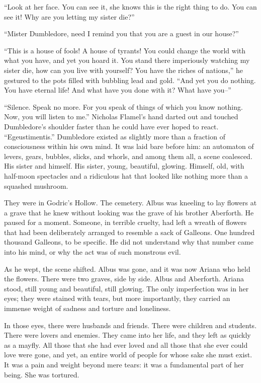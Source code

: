 “Look at her face. You can see it, she knows this is the right thing to do. You can see it! Why are you letting my sister die?”

“Mister Dumbledore, need I remind you that you are a guest in our house?”

“This is a house of fools! A house of tyrants! You could change the world with what you have, and yet you hoard it. You stand there imperiously watching my sister die, how can you live with yourself? You have the riches of nations,” he gestured to the pots filled with bubbling lead and gold. “And yet you do nothing. You have eternal life! And what have you done with it? What have you–”

“Silence. Speak no more. For you speak of things of which you know nothing. Now, you will listen to me.” Nicholas Flamel’s hand darted out and touched Dumbledore’s shoulder faster than he could have ever hoped to react. “Egeustimentis.”
\simpleline
Dumbledore existed as slightly more than a fraction of consciousness within his own mind. It was laid bare before him: an automaton of levers, gears, bubbles, slicks, and whorls, and among them all, a scene coalesced. His sister and himself. His sister, young, beautiful, glowing. Himself, old, with half-moon spectacles and a ridiculous hat that looked like nothing more than a squashed mushroom.

They were in Godric’s Hollow. The cemetery. Albus was kneeling to lay flowers at a grave that he knew without looking was the grave of his brother Aberforth. He paused for a moment. Someone, in terrible cruelty, had left a wreath of flowers that had been deliberately arranged to resemble a sack of Galleons. One hundred thousand Galleons, to be specific. He did not understand why that number came into his mind, or why the act was of such monstrous evil.

As he wept, the scene shifted. Albus was gone, and it was now Ariana who held the flowers. There were two graves, side by side. Albus and Aberforth. Ariana stood, still young and beautiful, still glowing. The only imperfection was in her eyes; they were stained with tears, but more importantly, they carried an immense weight of sadness and torture and loneliness.

In those eyes, there were husbands and friends. There were children and students. There were lovers and enemies. They came into her life, and they left as quickly as a mayfly. All those that she had ever loved and all those that she ever could love were gone, and yet, an entire world of people for whose sake she must exist. It was a pain and weight beyond mere tears: it was a fundamental part of her being. She was tortured.

